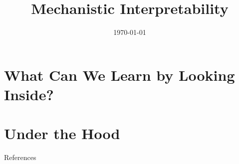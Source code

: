 \documentclass[aspectratio=169]{beamer}
\title{Mechanistic Interpretability}
\subtitle{\coursetitle}
\author{\instructor}
\date{\today}
\begin{document}
{\darkbg
\begin{frame}[plain]
\titlepage
\end{frame}}

\part{What Can We Learn by Looking Inside?}



\part{Under the Hood}






\begin{frame}[allowframebreaks]{References}
\printbibliography[heading=none]
\end{frame}
\end{document}
